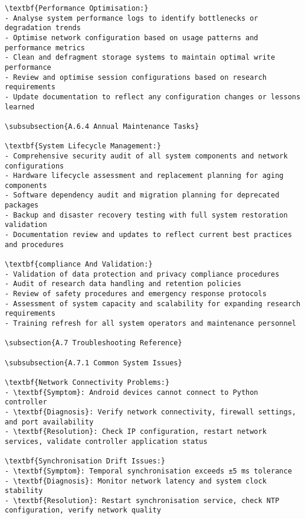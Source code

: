 \begin{verbatim}
\textbf{Performance Optimisation:}
- Analyse system performance logs to identify bottlenecks or degradation trends
- Optimise network configuration based on usage patterns and performance metrics
- Clean and defragment storage systems to maintain optimal write performance
- Review and optimise session configurations based on research requirements
- Update documentation to reflect any configuration changes or lessons learned

\subsubsection{A.6.4 Annual Maintenance Tasks}

\textbf{System Lifecycle Management:}
- Comprehensive security audit of all system components and network configurations
- Hardware lifecycle assessment and replacement planning for aging components
- Software dependency audit and migration planning for deprecated packages
- Backup and disaster recovery testing with full system restoration validation
- Documentation review and updates to reflect current best practices and procedures

\textbf{compliance And Validation:}
- Validation of data protection and privacy compliance procedures
- Audit of research data handling and retention policies
- Review of safety procedures and emergency response protocols
- Assessment of system capacity and scalability for expanding research requirements
- Training refresh for all system operators and maintenance personnel

\subsection{A.7 Troubleshooting Reference}

\subsubsection{A.7.1 Common System Issues}

\textbf{Network Connectivity Problems:}
- \textbf{Symptom}: Android devices cannot connect to Python controller
- \textbf{Diagnosis}: Verify network connectivity, firewall settings, and port availability
- \textbf{Resolution}: Check IP configuration, restart network services, validate controller application status

\textbf{Synchronisation Drift Issues:}
- \textbf{Symptom}: Temporal synchronisation exceeds ±5 ms tolerance
- \textbf{Diagnosis}: Monitor network latency and system clock stability
- \textbf{Resolution}: Restart synchronisation service, check NTP configuration, verify network quality


\end{verbatim}
